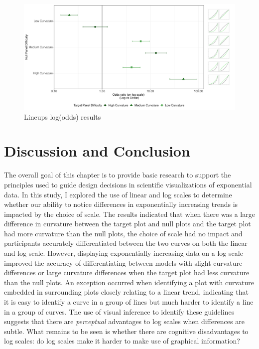 \documentclass[print]{nuthesis}
\begin{document}
\begin{figure}[tbp]

{\centering \includegraphics[width=\linewidth,]{thesis_files/figure-latex/odds-ratio-plot-1} 

}

\caption{Lineups log(odds) results}\label{fig:odds-ratio-plot}
\end{figure}

\hypertarget{discussion-and-conclusion}{%
\section{Discussion and Conclusion}\label{discussion-and-conclusion}}

The overall goal of this chapter is to provide basic research to support the principles used to guide design decisions in scientific visualizations of exponential data.
In this study, I explored the use of linear and log scales to determine whether our ability to notice differences in exponentially increasing trends is impacted by the choice of scale.
The results indicated that when there was a large difference in curvature between the target plot and null plots and the target plot had more curvature than the null plots, the choice of scale had no impact and participants accurately differentiated between the two curves on both the linear and log scale.
However, displaying exponentially increasing data on a log scale improved the accuracy of differentiating between models with slight curvature differences or large curvature differences when the target plot had less curvature than the null plots.
An exception occurred when identifying a plot with curvature embedded in surrounding plots closely relating to a linear trend, indicating that it is easy to identify a curve in a group of lines but much harder to identify a line in a group of curves.
The use of visual inference to identify these guidelines suggests that there are \emph{perceptual} advantages to log scales when differences are subtle.
What remains to be seen is whether there are cognitive disadvantages to log scales: do log scales make it harder to make use of graphical information?
\end{document}
